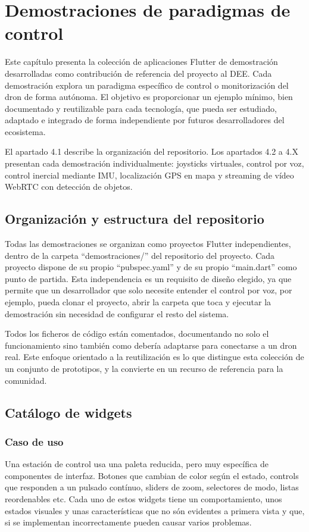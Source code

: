 \chapter{Demostraciones de paradigmas de control}
Este capítulo presenta la colección de aplicaciones Flutter de demostración desarrolladas como contribución de referencia del proyecto al DEE. Cada demostración explora un paradigma específico de control o monitorización del dron de forma autónoma. El objetivo es proporcionar un ejemplo mínimo, bien documentado y reutilizable para cada tecnología, que pueda ser estudiado, adaptado e integrado de forma independiente por futuros desarrolladores del ecosistema.

El apartado 4.1 describe la organización del repositorio. Los apartados 4.2 a 4.X presentan cada demostración individualmente: joysticks virtuales, control por voz, control inercial mediante IMU, localización GPS en mapa y streaming de vídeo WebRTC con detección de objetos.

\section{Organización y estructura del repositorio}
Todas las demostraciones se organizan como proyectos Flutter independientes, dentro de la carpeta “demostraciones/” del repositorio del proyecto. Cada proyecto dispone de su propio “pubspec.yaml” y de su propio “main.dart” como punto de partida. Esta independencia es un requisito de diseño elegido, ya que permite que un desarrollador que solo necesite entender el control por voz, por ejemplo, pueda clonar el proyecto, abrir la carpeta que toca y ejecutar la demostración sin necesidad de configurar el resto del sistema.

Todos los ficheros de código están comentados, documentando no solo el funcionamiento sino también como debería adaptarse para conectarse a un dron real. Este enfoque orientado a la reutilización es lo que distingue esta colección de un conjunto de prototipos, y la convierte en un recurso de referencia para la comunidad.

\section{Catálogo de widgets}

\subsection{Caso de uso}
Una estación de control usa una paleta reducida, pero muy específica de componentes de interfaz. Botones que cambian de color según el estado, controls que responden a un pulsado contínuo, sliders de zoom, selectores de modo, listas reordenables etc. Cada uno de estos widgets tiene un comportamiento, unos estados visuales y unas características que no són evidentes a primera vista y que, si se implementan incorrectamente pueden causar varios problemas. 

